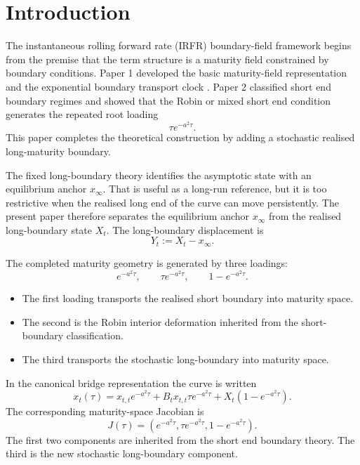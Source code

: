 \documentclass[11pt]{article}
\numberwithin{equation}{section}
\begin{document}
\section{Introduction}

The instantaneous rolling forward rate (IRFR) boundary-field framework begins from the premise that the term structure is a maturity field constrained by boundary conditions. Paper 1 developed the basic maturity-field representation and the exponential boundary transport clock \cite{OzaIRFR}. Paper 2 classified short end boundary regimes and showed that the Robin or mixed short end condition generates the repeated root loading \cite{OzaShortBoundary}
\[
 \tau e^{-a^2\tau}.
\]
This paper completes the theoretical construction by adding a stochastic realised long-maturity boundary.

The fixed long-boundary theory identifies the asymptotic state with an equilibrium anchor \(x_\infty\). That is useful as a long-run reference, but it is too restrictive when the realised long end of the curve can move persistently. The present paper therefore separates the equilibrium anchor \(x_\infty\) from the realised long-boundary state \(X_t\). The long-boundary displacement is
\begin{equation}
\label{eq:Y-definition}
Y_t:=X_t-x_\infty.
\end{equation}

The completed maturity geometry is generated by three loadings:
\begin{equation}
\label{eq:three-loadings}
e^{-a^2\tau},
\qquad
\tau e^{-a^2\tau},
\qquad
1-e^{-a^2\tau}.
\end{equation}
\begin{itemize}
    \item The first loading transports the realised short boundary into maturity space. 
    \item The second is the Robin interior deformation inherited from the short-boundary classification. 
    \item The third transports the stochastic long-boundary into maturity space.
\end{itemize}

In the canonical bridge representation the curve is written
\begin{equation}
\label{eq:canonical-bridge-intro}
x_t(\tau)
=
x_{t,t}e^{-a^2\tau}
+
B_tx_{t,t}\tau e^{-a^2\tau}
+
X_t\left(1-e^{-a^2\tau}\right).
\end{equation}
The corresponding maturity-space Jacobian is
\begin{equation}
\label{eq:intro-jacobian}
J(\tau)
=
\left(
 e^{-a^2\tau},
 \tau e^{-a^2\tau},
 1-e^{-a^2\tau}
\right).
\end{equation}
The first two components are inherited from the short end boundary theory. The third is the new stochastic long-boundary component.
\end{document}
